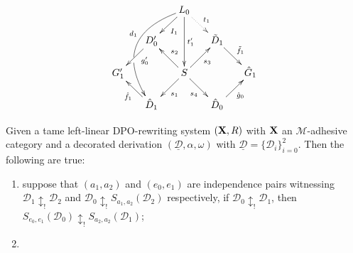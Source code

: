 \documentclass[a4paper,UKenglish,cleveref,pdftex, thm-restate,numberwithinsect]{lipics}
\def\R{\mathsf{R}}
\def\X{\textbf {\textup{X}}}
\newcommand{\dder}[1]{\mathscr{#1}}
\newcommand{\der}[1]{\underline{\dder{#1}}}
\begin{document}
\[\xymatrix@R=15pt@C=15pt{&&L_ 0\ar[dl]^{I_1} \ar@/_1.2cm/[dddl]_(.4){d_1}|(.63)\hole\ar[dd]^{t'_1} \ar@{.>}[dr]^{t_1}\\&D'_0 \ar[dl]^(.4){g'_0}&&\tilde{D}_1 \ar[dr]^{\tilde{f}_1}\\G'_1 && S\ar[dr]_{s_4} \ar[ur]_{s_3}\ar[dl]^{s_1} \ar[ul]_{s_2}&&\hat{G}_1\\& \hat{D}_1 \ar[ul]^{\hat{f}_1}&&\hat{D}_0 \ar[ur]_{\hat{g}_0}}\]






\newpage 
\iffalse 
\begin{corollary} Given a tame  left-linear DPO-rewriting system  $(\X,\R)$ with $\X$ an $\mathcal{M}$-adhesive category and a decorated derivation $(\der{D}, \alpha, \omega)$ with $\der{D}=\{\dder{D}_i\}_{i=0}^2$. Then the following are true: 
	\begin{enumerate}
		\item suppose that $(a_1,a_2)$ and $(e_0,e_1)$ are independence pairs witnessing  $\dder{D}_1\updownarrow_! \dder{D}_2$ and $\dder{D}_0\updownarrow_! S_{a_1,a_2}(\dder{D}_2)$ respectively, if $\dder{D}_0\updownarrow_!\dder{D}_1$, then $S_{e_0,e_1}(\dder{D}_0)\updownarrow_!S_{a_2,a_2}(\dder{D}_1)$;
		\item 
	\end{enumerate}
\end{corollary}
\end{document}
